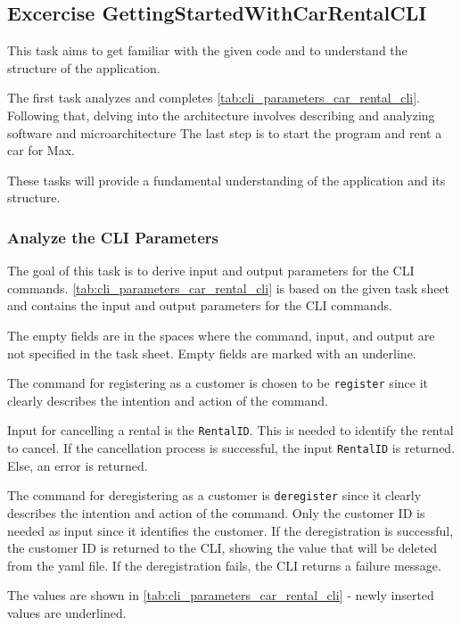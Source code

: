 \subsection{Excercise GettingStartedWithCarRentalCLI}
\label{sec:exercise_getting_started_with_car_rental_cli}
This task aims to get familiar with the given code and to understand the structure of the application.

The first task analyzes and completes \autoref{tab:cli_parameters_car_rental_cli}.
Following that, delving into the architecture involves describing and analyzing software and microarchitecture
The last step is to start the program and rent a car for Max.

These tasks will provide a fundamental understanding of the application and its structure.

\subsubsection*{Analyze the CLI Parameters}
The goal of this task is to derive input and output parameters for the CLI commands.
\autoref{tab:cli_parameters_car_rental_cli} is based on the given task sheet and contains the input and output parameters for the CLI commands.

The empty fields are in the spaces where the command, input, and output are not specified in the task sheet.
Empty fields are marked with an underline.

The command for registering as a customer is chosen to be \texttt{register} since it clearly describes the intention and action of the command.

Input for cancelling a rental is the \texttt{RentalID}.
This is needed to identify the rental to cancel.
If the cancellation process is successful, the input \texttt{RentalID} is returned.
Else, an error is returned.

The command for deregistering as a customer is \texttt{deregister} since it clearly describes the intention and action of the command.
Only the customer ID is needed as input since it identifies the customer.
If the deregistration is successful, the customer ID is returned to the CLI, showing the value that will be deleted from the yaml file.
If the deregistration fails, the CLI returns a failure message.

The values are shown in \autoref{tab:cli_parameters_car_rental_cli} - newly inserted values are underlined.

